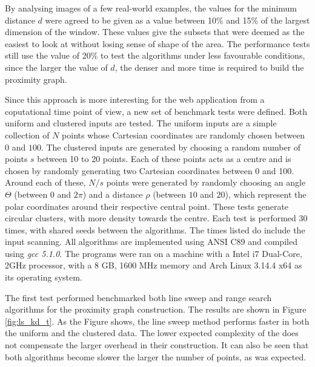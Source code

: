 
By analysing images of a few real-world examples, the values for the minimum distance $d$ were agreed to be given as a value between 10\% and 15\% of the largest dimension of the window. These values give the subsets that were deemed as the easiest to look at without losing sense of shape of the area. The performance tests still use the value of 20\% to test the algorithms under less favourable conditions, since the larger the value of $d$, the denser and more time is required to build the proximity graph. 

Since this approach is more interesting for the web application from a coputational time point of view, a new set of benchmark tests were defined. Both uniform and clustered inputs are tested. The uniform inputs are a simple collection of $N$ points whose Cartesian coordinates are randomly chosen between $0$ and $100$. The clustered inputs are generated by choosing a random number of points $s$ between 10 to 20 points. Each of these points acts as a centre and is chosen by randomly generating two Cartesian coordinates between 0 and 100. Around each of these, $N/s$ points were generated by randomly choosing an angle $\Theta$ (between $0$ and $2\pi$) and a distance $\rho$ (between $10$ and $20$), which represent the polar coordinates around their respective central point. These tests generate circular clusters, with more density towards the centre. Each test is performed 30 times, with shared seeds between the algorithms. The times listed do include the input scanning. All algorithms are implemented using ANSI C89 and compiled using \emph{gcc 5.1.0}. The programs were ran on a machine with a Intel i7 Dual-Core, 2GHz processor, with a 8 GB, 1600 MHz memory and Arch Linux 3.14.4 x64 as its operating system.

The first test performed benchmarked both line sweep and \kdtree range search algorithms for the proximity graph construction. The results are shown in Figure \ref{fig:ls_kd_t}. As the Figure shows, the line sweep method performs faster in both the uniform and the clustered data. The lower expected complexity of the \kdtrees does not compensate the larger overhead in their construction. It can also be seen that both algorithms become slower the larger the number of points, as was expected.

